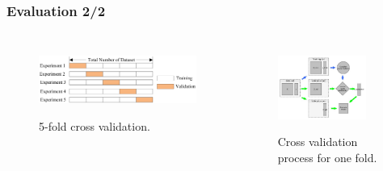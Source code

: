 \documentclass[10pt,handout,english]{beamer}
\begin{document}
		\begin{frame}
		\frametitle{Evaluation 2/2}
			\begin{columns}[c]
					\begin{figure}[h!]
			        	\centering
			        	\includegraphics[width=1.25\textwidth]{5_fold_cv.png}
			            \label{fig:netflix}
			            \caption{5-fold cross validation.}
			        \end{figure}
					\begin{figure}[h!]
			        	\centering
		            	\includegraphics[width=0.85\textwidth]{cv_process.jpg}
		                \label{fig:netflix}
		                \caption{Cross validation process for one fold.}
		            \end{figure}
			\end{columns}
		\end{frame}
\end{document}
